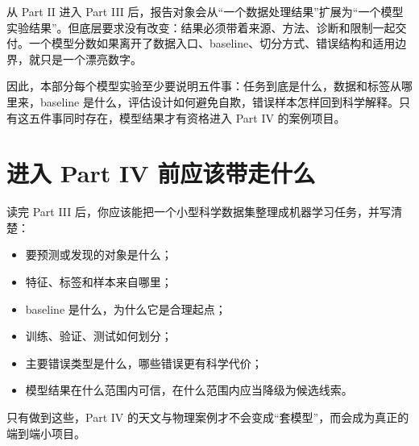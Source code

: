 从 Part II 进入 Part III 后，报告对象会从“一个数据处理结果”扩展为“一个模型实验结果”。但底层要求没有改变：结果必须带着来源、方法、诊断和限制一起交付。一个模型分数如果离开了数据入口、baseline、切分方式、错误结构和适用边界，就只是一个漂亮数字。

因此，本部分每个模型实验至少要说明五件事：任务到底是什么，数据和标签从哪里来，baseline 是什么，评估设计如何避免自欺，错误样本怎样回到科学解释。只有这五件事同时存在，模型结果才有资格进入 Part IV 的案例项目。

\section*{进入 Part IV 前应该带走什么}

读完 Part III 后，你应该能把一个小型科学数据集整理成机器学习任务，并写清楚：

\begin{itemize}
    \item 要预测或发现的对象是什么；
    \item 特征、标签和样本来自哪里；
    \item baseline 是什么，为什么它是合理起点；
    \item 训练、验证、测试如何划分；
    \item 主要错误类型是什么，哪些错误更有科学代价；
    \item 模型结果在什么范围内可信，在什么范围内应当降级为候选线索。
\end{itemize}

只有做到这些，Part IV 的天文与物理案例才不会变成“套模型”，而会成为真正的端到端小项目。
